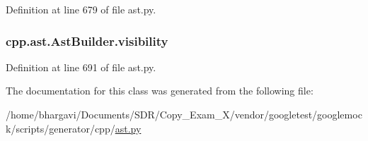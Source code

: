 Definition at line 679 of file ast.\+py.

\subsubsection[{\texorpdfstring{visibility}{visibility}}]{\setlength{\rightskip}{0pt plus 5cm}cpp.\+ast.\+Ast\+Builder.\+visibility}\hypertarget{classcpp_1_1ast_1_1_ast_builder_a2f16b19846c405101235432d2666b614}{}\label{classcpp_1_1ast_1_1_ast_builder_a2f16b19846c405101235432d2666b614}


Definition at line 691 of file ast.\+py.



The documentation for this class was generated from the following file\+:\begin{DoxyCompactItemize}
\item 
/home/bhargavi/\+Documents/\+S\+D\+R/\+Copy\+\_\+\+Exam\+\_\+X/vendor/googletest/googlemock/scripts/generator/cpp/\hyperlink{ast_8py}{ast.\+py}\end{DoxyCompactItemize}
